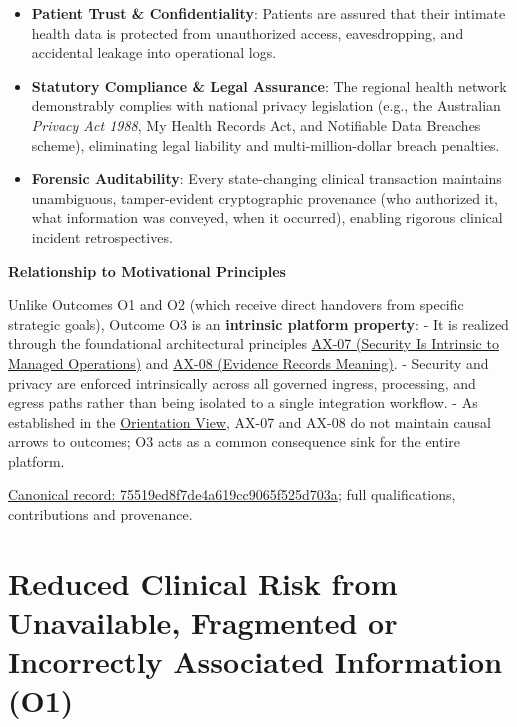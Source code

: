 \begin{itemize}


\item \textbf{Patient Trust \& Confidentiality}: Patients are assured that their intimate health data is protected from unauthorized access, eavesdropping, and accidental leakage into operational logs.

\item \textbf{Statutory Compliance \& Legal Assurance}: The regional health network demonstrably complies with national privacy legislation (e.g., the Australian \emph{Privacy Act 1988}, My Health Records Act, and Notifiable Data Breaches scheme), eliminating legal liability and multi-million-dollar breach penalties.

\item \textbf{Forensic Auditability}: Every state-changing clinical transaction maintains unambiguous, tamper-evident cryptographic provenance (who authorized it, what information was conveyed, when it occurred), enabling rigorous clinical incident retrospectives.

\end{itemize}


\par\medskip\textbf{Relationship to Motivational Principles}\par


Unlike Outcomes O1 and O2 (which receive direct handovers from specific strategic goals), Outcome O3 is an \textbf{intrinsic platform property}:
- It is realized through the foundational architectural principles \hyperref[element:5de2ae2c3b794c2d9f3a14efd51d564f]{AX-07 (Security Is Intrinsic to Managed Operations)} and \hyperref[element:21d6864657964ba5b03e3f6b5eb29cd5]{AX-08 (Evidence Records Meaning)}.
- Security and privacy are enforced intrinsically across all governed ingress, processing, and egress paths rather than being isolated to a single integration workflow.
- As established in the \href{\detokenize{../../../../../docs/markdown/01-motivation/orientation-view.md}}{Orientation View}, AX-07 and AX-08 do not maintain causal arrows to outcomes; O3 acts as a common consequence sink for the entire platform.


{\footnotesize \href{../../../../continuum/motivation/outcome/75519ed8f7de4a619cc9065f525d703a.md}{Canonical record: 75519ed8f7de4a619cc9065f525d703a}; full qualifications, contributions and provenance.}\par
\section{Reduced Clinical Risk from Unavailable, Fragmented or Incorrectly Associated Information (O1)}

